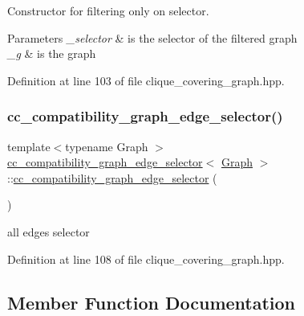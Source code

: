 Constructor for filtering only on selector. 


\begin{DoxyParams}{Parameters}
{\em \+\_\+selector} & is the selector of the filtered graph \\
\hline
{\em \+\_\+g} & is the graph \\
\hline
\end{DoxyParams}


Definition at line 103 of file clique\+\_\+covering\+\_\+graph.\+hpp.

\mbox{\label{structcc__compatibility__graph__edge__selector_a0382cacea886b26aa0159f2982160e4f}} 
\subsubsection{\texorpdfstring{cc\+\_\+compatibility\+\_\+graph\+\_\+edge\+\_\+selector()}{cc\_compatibility\_graph\_edge\_selector()}\hspace{0.1cm}{\footnotesize\ttfamily [2/2]}}
{\footnotesize\ttfamily template$<$typename Graph $>$ \\
\hyperlink{structcc__compatibility__graph__edge__selector}{cc\+\_\+compatibility\+\_\+graph\+\_\+edge\+\_\+selector}$<$ \hyperlink{structGraph}{Graph} $>$\+::\hyperlink{structcc__compatibility__graph__edge__selector}{cc\+\_\+compatibility\+\_\+graph\+\_\+edge\+\_\+selector} (\begin{DoxyParamCaption}{ }\end{DoxyParamCaption})\hspace{0.3cm}{\ttfamily [inline]}}



all edges selector 



Definition at line 108 of file clique\+\_\+covering\+\_\+graph.\+hpp.



\subsection{Member Function Documentation}
\mbox{\label{structcc__compatibility__graph__edge__selector_aaf804ff43aded2dc5261789e2e673cc5}} 
